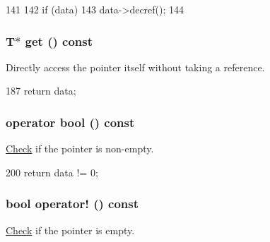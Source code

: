 \begin{DoxyCode}
141     {
142         if (data)
143             data->decref();
144     }
\end{DoxyCode}
\hypertarget{classRefCountingPtr_a07f851191ad3a7c5c1598ef14f710f96}{
\subsubsection[{get}]{\setlength{\rightskip}{0pt plus 5cm}T$\ast$ get () const}}
\label{classRefCountingPtr_a07f851191ad3a7c5c1598ef14f710f96}


Directly access the pointer itself without taking a reference. 


\begin{DoxyCode}
187 { return data; }
\end{DoxyCode}
\hypertarget{classRefCountingPtr_aa385aa18f5e42db5a415c25a90f4193d}{
\subsubsection[{operator bool}]{\setlength{\rightskip}{0pt plus 5cm}operator bool () const}}
\label{classRefCountingPtr_aa385aa18f5e42db5a415c25a90f4193d}


\hyperlink{classCheck}{Check} if the pointer is non-\/empty. 


\begin{DoxyCode}
200 { return data != 0; }
\end{DoxyCode}
\hypertarget{classRefCountingPtr_ac8b1d32dbd52d431450c70b151cfa205}{
\subsubsection[{operator!}]{\setlength{\rightskip}{0pt plus 5cm}bool operator! () const}}
\label{classRefCountingPtr_ac8b1d32dbd52d431450c70b151cfa205}


\hyperlink{classCheck}{Check} if the pointer is empty. 


